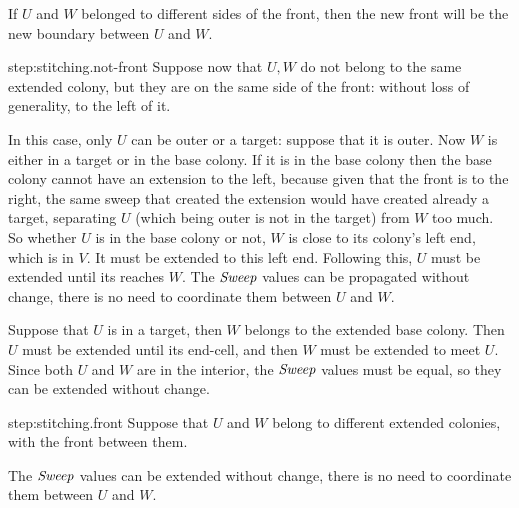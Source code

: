 \documentclass[11pt]{memoir}
\theoremstyle{definition} %
\renewcommand{\ge}{\geq}
\newcommand{\fld}[1]{\ensuremath{\textit{#1\/}}}
\newcommand{\Sweep}{\fld{Sweep}} %
\begin{document}
\begin{Proof}
\begin{prooof}
If \( U  \) and \( W \) belonged to different sides of the front, then the
new front will be the new boundary between \( U \) and \( W \).
\end{prooof} %

\begin{step+}{step:stitching.not-front}
Suppose now that \( U,W \) do not belong to the same extended colony, but they are on 
the same side of the front: without loss of generality, to the left of it.
\end{step+}
\begin{prooof}
In this case, only \( U \) can be outer or a target: suppose that it is outer.
Now \( W \) is either in a target or in the base colony.
If it is in the base colony then the base colony
cannot have an extension to the left, because given that the front
is to the right, the same sweep that created the extension would have created already a target, 
separating \( U \) (which being outer is not in the target) from \( W \) too much.
So whether \( U \) is in the base colony or not,
\( W \) is close to its colony's left end, which is in \( V \).
It must be extended to this left end.
Following this, \( U \) must be extended until its reaches \( W \).
The \( \Sweep \) values can be propagated without change, there is no need to coordinate them
between \( U \) and \( W \).

Suppose that \( U \) is in a target, then \( W \) belongs to the extended base colony.
Then \( U \) must be extended until its end-cell, and then \( W \) must be extended to meet \( U \).
Since both \( U \) and \( W \) are in the interior, the \( \Sweep \) values must be equal, so they
can be extended without change.
\end{prooof} %

\begin{step+}{step:stitching.front}
Suppose that \( U \) and \( W \) belong to different extended colonies, with the front between them.
\end{step+}
\begin{prooof}
The \( \Sweep \) values can be extended without change, there is no need to coordinate them
between \( U \) and \( W \).


\end{prooof}
\end{Proof}
\end{document}
